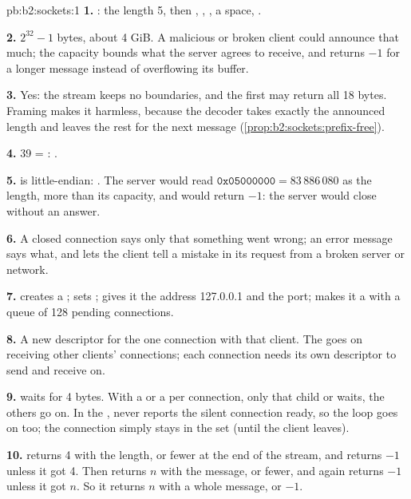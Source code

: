 \begin{solution}{pb:b2:sockets:1}
\textbf{1.} : the length 5, then , , , a space, .

\textbf{2.} $2^{32} - 1$ bytes, about 4 GiB. A malicious or broken client could announce that much; the capacity
bounds what the server agrees to receive, and  returns $-1$ for a longer message instead of
overflowing its buffer.

\textbf{3.} Yes: the stream keeps no boundaries, and the first  may return all 18 bytes. Framing makes it
harmless, because the decoder takes exactly the announced length and leaves the rest for the next message
(\cref{prop:b2:sockets:prefix-free}).

\textbf{4.} 39 = : .

\textbf{5.}  is little-endian: . The server would read $\mathtt{0x05000000} = 83\,886\,080$
as the length, more than its capacity, and  would return $-1$: the server would close without an
answer.

\textbf{6.} A closed connection says only that something went wrong; an error message says what, and lets the client
tell a mistake in its request from a broken server or network.

\textbf{7.}  creates a ;  sets ;  gives it
the address 127.0.0.1 and the port;  makes it a  with a queue of 128 pending connections.

\textbf{8.} A new descriptor for the one connection with that client. The  goes on receiving other
clients' connections; each connection needs its own descriptor to send and receive on.

\textbf{9.}  waits for 4 bytes. With a  or a  per connection, only that child or 
waits, the others go on. In the ,  never reports the silent connection ready, so the loop goes on
too; the connection simply stays in the set (until the client leaves).

\textbf{10.}  returns 4 with the length, or fewer at the end of the stream, and
 returns $-1$ unless it got 4. Then  returns $n$ with the message, or fewer,
and again  returns $-1$ unless it got $n$. So it returns $n$ with a whole message, or $-1$.


\end{solution}
